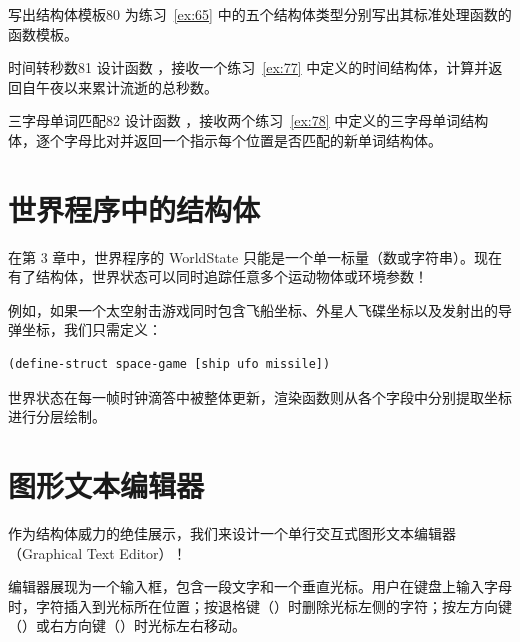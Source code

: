 \begin{exercise}{写出结构体模板}{80}
为练习~\ref{ex:65} 中的五个结构体类型分别写出其标准处理函数的函数模板。
\end{exercise}

\begin{exercise}{时间转秒数}{81}
设计函数 ，接收一个练习~\ref{ex:77} 中定义的时间结构体，计算并返回自午夜以来累计流逝的总秒数。
\end{exercise}

\begin{exercise}{三字母单词匹配}{82}
设计函数 ，接收两个练习~\ref{ex:78} 中定义的三字母单词结构体，逐个字母比对并返回一个指示每个位置是否匹配的新单词结构体。
\end{exercise}

\section{世界程序中的结构体}
\label{sec:5.9_structure_in_the_world}

在第 3 章中，世界程序的 WorldState 只能是一个单一标量（数或字符串）。现在有了结构体，世界状态可以同时追踪任意多个运动物体或环境参数！

例如，如果一个太空射击游戏同时包含飞船坐标、外星人飞碟坐标以及发射出的导弹坐标，我们只需定义：
\begin{lstlisting}[language=BSL]
(define-struct space-game [ship ufo missile])
\end{lstlisting}
世界状态在每一帧时钟滴答中被整体更新，渲染函数则从各个字段中分别提取坐标进行分层绘制。

\section{图形文本编辑器}
\label{sec:5.10_a_graphical_editor}

作为结构体威力的绝佳展示，我们来设计一个单行交互式图形文本编辑器（Graphical Text Editor）！

编辑器展现为一个输入框，包含一段文字和一个垂直光标。用户在键盘上输入字母时，字符插入到光标所在位置；按退格键（）时删除光标左侧的字符；按左方向键（）或右方向键（）时光标左右移动。

